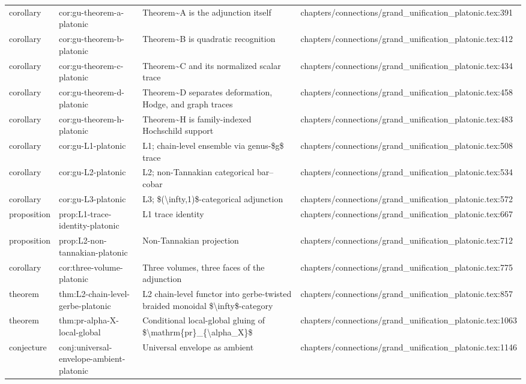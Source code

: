\documentclass[11pt]{article}
\begin{document}
\begin{longtable}{L{0.10\textwidth}L{0.26\textwidth}L{0.42\textwidth}L{0.22\textwidth}}
corollary & cor:gu-theorem-a-platonic & Theorem\textasciitilde{}A is the adjunction itself & chapters/connections/grand\_unification\_platonic.tex:391\\
corollary & cor:gu-theorem-b-platonic & Theorem\textasciitilde{}B is quadratic recognition & chapters/connections/grand\_unification\_platonic.tex:412\\
corollary & cor:gu-theorem-c-platonic & Theorem\textasciitilde{}C and its normalized scalar trace & chapters/connections/grand\_unification\_platonic.tex:434\\
corollary & cor:gu-theorem-d-platonic & Theorem\textasciitilde{}D separates deformation, Hodge, and graph traces & chapters/connections/grand\_unification\_platonic.tex:458\\
corollary & cor:gu-theorem-h-platonic & Theorem\textasciitilde{}H is family-indexed Hochschild support & chapters/connections/grand\_unification\_platonic.tex:483\\
corollary & cor:gu-L1-platonic & L1; chain-level ensemble via genus-\$g\$ trace & chapters/connections/grand\_unification\_platonic.tex:508\\
corollary & cor:gu-L2-platonic & L2; non-Tannakian categorical bar--cobar & chapters/connections/grand\_unification\_platonic.tex:534\\
corollary & cor:gu-L3-platonic & L3; \$(\textbackslash{}infty,1)\$-categorical adjunction & chapters/connections/grand\_unification\_platonic.tex:572\\
proposition & prop:L1-trace-identity-platonic & L1 trace identity & chapters/connections/grand\_unification\_platonic.tex:667\\
proposition & prop:L2-non-tannakian-platonic & Non-Tannakian projection & chapters/connections/grand\_unification\_platonic.tex:712\\
corollary & cor:three-volume-platonic & Three volumes, three faces of the adjunction & chapters/connections/grand\_unification\_platonic.tex:775\\
theorem & thm:L2-chain-level-gerbe-platonic & L2 chain-level functor into gerbe-twisted braided monoidal \$\textbackslash{}infty\$-category & chapters/connections/grand\_unification\_platonic.tex:857\\
theorem & thm:pr-alpha-X-local-global & Cond{}itional local-global gluing of \$\textbackslash{}mathrm\{pr\}\_\{\textbackslash{}alpha\_X\}\$ & chapters/connections/grand\_unification\_platonic.tex:1063\\
conjecture & conj:universal-envelope-ambient-platonic & Universal envelope as ambient & chapters/connections/grand\_unification\_platonic.tex:1146\\

\end{longtable}
\end{document}
